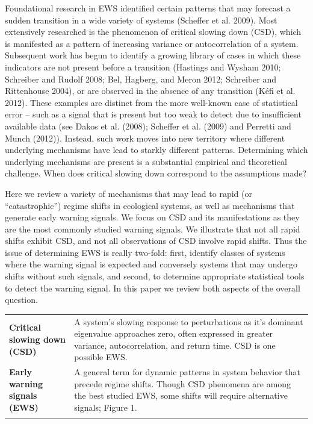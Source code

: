 \documentclass[author-year, review]{elsarticle} %
\begin{document}
Foundational research in EWS identified certain patterns that may
forecast a sudden transition in a wide variety of systems (Scheffer et
al. 2009). Most extensively researched is the phenomenon of critical
slowing down (CSD), which is manifested as a pattern of increasing
variance or autocorrelation of a system. Subsequent work has begun to
identify a growing library of cases in which these indicators are not
present before a transition (Hastings and Wysham 2010; Schreiber and
Rudolf 2008; Bel, Hagberg, and Meron 2012; Schreiber and Rittenhouse
2004), or are observed in the absence of any transition (Kéfi et al.
2012). These examples are distinct from the more well-known case of
statistical error -- such as a signal that is present but too weak to
detect due to insufficient available data (see Dakos et al. (2008);
Scheffer et al. (2009) and Perretti and Munch (2012)). Instead, such
work moves into new territory where different underlying mechanisms have
lead to starkly different patterns. Determining which underlying
mechanisms are present is a substantial empirical and theoretical
challenge. When does critical slowing down correspond to the assumptions
made?

Here we review a variety of mechanisms that may lead to rapid (or
``catastrophic'') regime shifts in ecological systems, as well as
mechanisms that generate early warning signals. We focus on CSD and its
manifestations as they are the most commonly studied warning signals. We
illustrate that not all rapid shifts exhibit CSD, and not all
observations of CSD involve rapid shifts. Thus the issue of determining
EWS is really two-fold: first, identify classes of systems where the
warning signal is expected and conversely systems that may undergo
shifts without such signals, and second, to determine appropriate
statistical tools to detect the warning signal. In this paper we review
both aspects of the overall question.

\begin{longtable}[c]{@{}ll@{}}
\hline\noalign{\medskip}
\begin{minipage}[t]{0.44\columnwidth}\raggedright
\textbf{Critical slowing down (CSD)}
\end{minipage} & \begin{minipage}[t]{0.56\columnwidth}\raggedright
A system's slowing response to perturbations as it's dominant eigenvalue
approaches zero, often expressed in greater variance, autocorrelation,
and return time. CSD is one possible EWS.
\end{minipage}
\\\noalign{\medskip}
\begin{minipage}[t]{0.44\columnwidth}\raggedright
\textbf{Early warning signals (EWS)}
\end{minipage} & \begin{minipage}[t]{0.56\columnwidth}\raggedright
A general term for dynamic patterns in system behavior that precede
regime shifts. Though CSD phenomena are among the best studied EWS, some
shifts will require alternative signals; Figure 1.
\end{minipage}
\\\noalign{\medskip}
\hline
\end{longtable}
\end{document}
